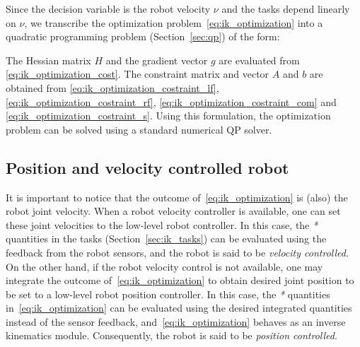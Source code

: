 Since the decision variable is the robot velocity $\nu$ and the tasks depend linearly on $\nu$, we transcribe the optimization problem~\eqref{eq:ik_optimization} into a quadratic programming problem (Section~\ref{sec:qp}) of the form: 
The Hessian matrix $H$ and the gradient vector $g$ are evaluated from \eqref{eq:ik_optimization_cost}.
The constraint matrix and vector $A$ and $b$ are obtained from \eqref{eq:ik_optimization_costraint_lf},  \eqref{eq:ik_optimization_costraint_rf},  \eqref{eq:ik_optimization_costraint_com} and  \eqref{eq:ik_optimization_costraint_s}.
Using this formulation, the optimization problem can be solved using a standard numerical QP solver.

\subsection{Position and velocity controlled robot}
\label{subsubsec-pos-vel-control}
It is important to notice that the outcome of~\eqref{eq:ik_optimization} is (also) the robot joint velocity. When a robot velocity controller is available, one can set these joint velocities to the low-level robot controller. In this case, the \emph{*} quantities in the tasks (Section~\ref{sec:ik_tasks}) can be evaluated using the feedback from the robot sensors, and the robot is said to be \emph{velocity controlled}. On the other hand, if the robot velocity control is not available, one may integrate the outcome of~\eqref{eq:ik_optimization} to obtain desired joint position to be set to a low-level robot position controller. In this case, the \emph{*} quantities in~\eqref{eq:ik_optimization} can be evaluated using the desired integrated quantities instead of the sensor feedback, and~\eqref{eq:ik_optimization} behaves as an inverse kinematics module. Consequently, the robot is said to be \emph{position controlled}.
